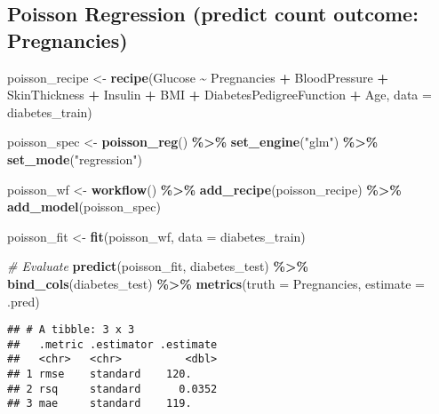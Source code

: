 \documentclass[
]{article}
\newenvironment{Shaded}{\begin{snugshade}}{\end{snugshade}}
\newcommand{\AttributeTok}[1]{\textcolor[rgb]{0.13,0.29,0.53}{#1}}
\newcommand{\CommentTok}[1]{\textcolor[rgb]{0.56,0.35,0.01}{\textit{#1}}}
\newcommand{\FunctionTok}[1]{\textcolor[rgb]{0.13,0.29,0.53}{\textbf{#1}}}
\newcommand{\NormalTok}[1]{#1}
\newcommand{\OtherTok}[1]{\textcolor[rgb]{0.56,0.35,0.01}{#1}}
\newcommand{\SpecialCharTok}[1]{\textcolor[rgb]{0.81,0.36,0.00}{\textbf{#1}}}
\newcommand{\StringTok}[1]{\textcolor[rgb]{0.31,0.60,0.02}{#1}}
\begin{document}
\subsection{Poisson Regression (predict count outcome:
Pregnancies)}\label{poisson-regression-predict-count-outcome-pregnancies}

\begin{Shaded}
\begin{Highlighting}[]
\NormalTok{poisson\_recipe }\OtherTok{\textless{}{-}} \FunctionTok{recipe}\NormalTok{(Glucose }\SpecialCharTok{\textasciitilde{}}\NormalTok{ Pregnancies }\SpecialCharTok{+}\NormalTok{ BloodPressure }\SpecialCharTok{+}\NormalTok{ SkinThickness }\SpecialCharTok{+} 
\NormalTok{                         Insulin }\SpecialCharTok{+}\NormalTok{ BMI }\SpecialCharTok{+}\NormalTok{ DiabetesPedigreeFunction }\SpecialCharTok{+}\NormalTok{ Age, }\AttributeTok{data =}\NormalTok{ diabetes\_train)}

\NormalTok{poisson\_spec }\OtherTok{\textless{}{-}} \FunctionTok{poisson\_reg}\NormalTok{() }\SpecialCharTok{\%\textgreater{}\%}
  \FunctionTok{set\_engine}\NormalTok{(}\StringTok{"glm"}\NormalTok{) }\SpecialCharTok{\%\textgreater{}\%}
  \FunctionTok{set\_mode}\NormalTok{(}\StringTok{"regression"}\NormalTok{)}

\NormalTok{poisson\_wf }\OtherTok{\textless{}{-}} \FunctionTok{workflow}\NormalTok{() }\SpecialCharTok{\%\textgreater{}\%}
  \FunctionTok{add\_recipe}\NormalTok{(poisson\_recipe) }\SpecialCharTok{\%\textgreater{}\%}
  \FunctionTok{add\_model}\NormalTok{(poisson\_spec)}

\NormalTok{poisson\_fit }\OtherTok{\textless{}{-}} \FunctionTok{fit}\NormalTok{(poisson\_wf, }\AttributeTok{data =}\NormalTok{ diabetes\_train)}

\CommentTok{\# Evaluate}
\FunctionTok{predict}\NormalTok{(poisson\_fit, diabetes\_test) }\SpecialCharTok{\%\textgreater{}\%}
  \FunctionTok{bind\_cols}\NormalTok{(diabetes\_test) }\SpecialCharTok{\%\textgreater{}\%}
  \FunctionTok{metrics}\NormalTok{(}\AttributeTok{truth =}\NormalTok{ Pregnancies, }\AttributeTok{estimate =}\NormalTok{ .pred)}
\end{Highlighting}
\end{Shaded}

\begin{verbatim}
## # A tibble: 3 x 3
##   .metric .estimator .estimate
##   <chr>   <chr>          <dbl>
## 1 rmse    standard    120.    
## 2 rsq     standard      0.0352
## 3 mae     standard    119.
\end{verbatim}
\end{document}
